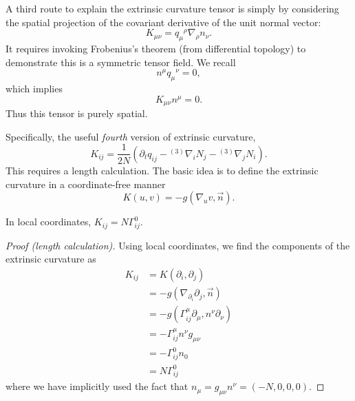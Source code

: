 A third route to explain the extrinsic curvature tensor is simply by
considering the spatial projection of the covariant derivative of the unit
normal vector:
\begin{equation}
K_{\mu\nu} = {q_{\mu}}^{\rho}\nabla_{\rho}n_{\nu}.
\end{equation}
It requires invoking Frobenius's theorem (from differential topology) to
demonstrate this is a symmetric tensor field. We recall
\begin{equation}
n^{\mu}{q_{\mu}}^{\nu} = 0,
\end{equation}
which implies
\begin{equation}
K_{\mu\nu}n^{\mu} = 0.
\end{equation}
Thus this tensor is purely spatial.

Specifically, the useful \emph{fourth} version of extrinsic curvature,
\begin{equation}\label{eq:extrinsic-curvature:as-time-derivative-of-three-metric}
K_{ij} = \frac{1}{2N}(\partial_{t}q_{ij} - {{}^{(3)}}\nabla_{i}N_{j} - {{}^{(3)}}\nabla_{j}N_{i}).
\end{equation}
This requires a length calculation. The basic idea is to define the
extrinsic curvature in a coordinate-free manner
\begin{equation}
K(u,v) = -g(\nabla_{u}v,\vec{n}).
\end{equation}

\begin{lemma}
In local coordinates, $K_{ij} = N\Gamma^{0}_{ij}$.
\end{lemma}
\begin{proof}[Proof (length calculation)]
Using local coordinates, we find the components of the extrinsic curvature as
\begin{subequations}
  \begin{align}
    K_{ij} &= K(\partial_{i}, \partial_{j})\\
    &= -g(\nabla_{\partial_{i}}\partial_{j}, \vec{n})\\
    &= -g(\Gamma^{\mu}_{ij}\partial_{\mu}, n^{\nu}\partial_{\nu})\\
    &= -\Gamma^{\mu}_{ij}n^{\nu}g_{\mu\nu}\\
    &= -\Gamma^{0}_{ij}n_{0}\\
    &= N\Gamma^{0}_{ij}
  \end{align}
\end{subequations}
where we have implicitly used the fact that
$n_{\mu}=g_{\mu\nu}n^{\nu}=(-N,0,0,0)$.
\end{proof}

